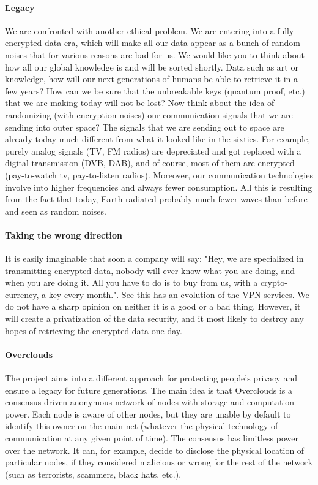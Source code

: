\paragraph{Legacy} We are confronted with another ethical problem. We are entering into a fully encrypted data era, which will make all our data appear as a bunch of random noises that for various reasons are bad for us. We would like you to think about how all our global knowledge is and will be sorted shortly. Data such as art or knowledge, how will our next generations of humans be able to retrieve it in a few years? How can we be sure that the unbreakable keys (quantum proof, etc.) that we are making today will not be lost?
Now think about the idea of randomizing (with encryption noises) our communication signals that we are sending into outer space? The signals that we are sending out to space are already today much different from what it looked like in the sixties. For example, purely analog signals (TV, FM radios) are depreciated and got replaced with a digital transmission (DVB, DAB), and of course, most of them are encrypted (pay-to-watch tv, pay-to-listen radios). Moreover, our communication technologies involve into higher frequencies and always fewer consumption. All this is resulting from the fact that today, Earth radiated probably much fewer waves than before and seen as random noises.

\paragraph{Taking the wrong direction} It is easily imaginable that soon a company will say: "Hey, we are specialized in transmitting encrypted data, nobody will ever know what you are doing, and when you are doing it. All you have to do is to buy from us, with a crypto-currency, a key every month.". See this has an evolution of the VPN services. We do not have a sharp opinion on neither it is a good or a bad thing. However, it will create a privatization of the data security, and it most likely to destroy any hopes of retrieving the encrypted data one day.

\paragraph{Overclouds} The project aims into a different approach for protecting people's privacy and ensure a legacy for future generations.
The main idea is that Overclouds is a consensus-driven anonymous network of nodes with storage and computation power. Each node is aware of other nodes, but they are unable by default to identify this owner on the main net (whatever the physical technology of communication at any given point of time). The consensus has limitless power over the network. It can, for example, decide to disclose the physical location of particular nodes, if they considered malicious or wrong for the rest of the network (such as terrorists, scammers, black hats, etc.).

